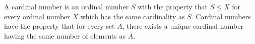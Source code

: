 \documentclass{article}
\begin{document}
A cardinal number is an ordinal number $S$ with the property that $S \leq X$ for every ordinal number $X$ which has the same cardinality as $S$. Cardinal numbers have the property that for every set $A$, there exists a unique cardinal number having the same number of elements as $A$.
\end{document}
